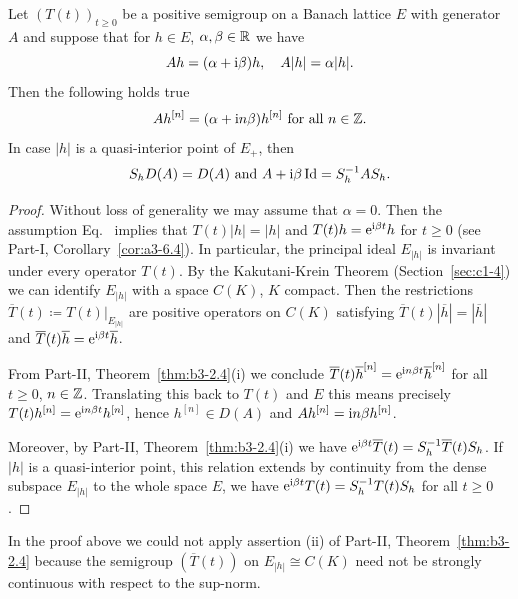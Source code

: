 \begin{theorem}\label{thm:c3-2.2}
	Let $(T(t))_{t\geq 0}$ be a positive semigroup on a Banach lattice $E$ with generator $A$ and suppose that for $h \in E$, $\alpha,\beta \in \mathbb{R} $ we have
	\begin{equation}\label{eq:c3-2.6}
		Ah = (\alpha+\mathrm{i}\beta )h, \quad A|h| = \alpha|h|.
	\end{equation}
Then the following holds true
\begin{equation}\label{eq:c3-2.7}
	Ah^{[n]} = (\alpha+\mathrm{i} n\beta)h^{[n]} \text{ for all } n \in \mathbb{Z} .
\end{equation}
In case $|h|$ is a quasi-interior point of\/ $E_{+}$, then
\[
S_{h}D(A) = D(A) \text{ and } A + \mathrm{i}\beta \operatorname{Id} = S_{h}^{-1}AS_{h} .
\]
\end{theorem}
\begin{proof}
	Without loss of generality we may assume that $\alpha = 0$.
	Then the assumption Eq.~ implies that $T(t)|h| = |h|$ and $T(t)h = \mathrm{e}^{\mathrm{i}\beta t}h$ for $t \geq 0$ (see Part-I, Corollary~\ref{cor:a3-6.4}).
	In particular, the principal ideal $E_{|h|}$ is invariant under every operator $T(t)$.
	By the Kakutani-Krein Theorem (Section~\ref{sec:c1-4}) we can identify $E_{|h|}$ with a space $C(K)$, $K$ compact.
	Then the restrictions $\overline{T}(t) \coloneq T(t)|_{E_{|h|}}$ are positive operators on $C(K)$ satisfying $\overline{T}(t)|\overline{h}| = |\overline{h}|$ and $\overline{T}(t)\overline{h} = \mathrm{e}^{\mathrm{i}\beta  t}\overline{h}$.
	
	From Part-II, Theorem~\ref{thm:b3-2.4}(i) we conclude $\overline{T}(t)\overline{h}^{[n]} = \mathrm{e}^{\mathrm{i} n\beta t}\overline{h}^{[n]}$ for all $t \geq 0$, $n \in \mathbb{Z}$.
	Translating this back to $T(t)$ and $E$ this means precisely $T(t)h^{[n]} = \mathrm{e}^{\mathrm{i} n\beta t}h^{[n]}$, hence $h^{[n]} \in D(A)$ and $Ah^{[n]} = \mathrm{i}  n\beta h^{[n]}$.
	
	Moreover, by Part-II, Theorem~\ref{thm:b3-2.4}(i) we have $\mathrm{e}^{\mathrm{i}\beta  t}\overline{T}(t) = S_{h}^{-1}\overline{T}(t)S_{h}$.
	If\/ $|h|$ is a quasi-interior point, this relation extends by continuity from the dense subspace $E_{|h|}$ to the whole space $E$, \ie  we have $\mathrm{e}^{\mathrm{i}\beta  t}T(t) = S_{h}^{-1}T(t)S_{h}$ for all $t \geq 0$.
\end{proof}
In the proof above we could not apply assertion (ii) of Part-II, Theorem~\ref{thm:b3-2.4} because the semigroup $(\overline{T}(t))$ on $E_{|h|} \cong C(K)$ need not be strongly continuous with respect to the sup-norm.


